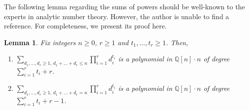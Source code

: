 \documentclass[12pt, reqno]{amsart}
\newtheorem{lemma}[theorem]{Lemma}
\theoremstyle{definition}
\theoremstyle{remark}
\numberwithin{equation}{section}
\newcommand{\Q}{ \mathbb Q }
\numberwithin{equation}{section}
\begin{document}
The following lemma regarding the sums of powers should be well-known 
to the experts in analytic number theory. However, the author is unable 
to find a reference. For completeness, we present its proof here.

\begin{lemma}  \label{sumofpowers} 
Fix integers $n \ge 0$, $r \ge 1$ and $t_1, \ldots, t_{r} \ge 1$. Then, 
\begin{enumerate}
\item[{\rm (i)}]
$\displaystyle{\sum_{d_1, \ldots, d_r \ge 1, \, d_1+ \ldots + d_r \le n}
  \prod_{i=1}^{r} d_i^{t_i}}$
is a polynomial in $\Q[n] \cdot n$ of degree $\sum_{i=1}^{r} t_i+r$.

\item[{\rm (ii)}]
$\displaystyle{\sum_{d_1, \ldots, d_r \ge 1, \, d_1+ \ldots + d_r = n}
  \prod_{i=1}^{r} d_i^{t_i}}$
is a polynomial in $\Q[n] \cdot n$ of degree $\sum_{i=1}^{r} t_i+r-1$.
\end{enumerate}
\end{lemma}
\end{document}
